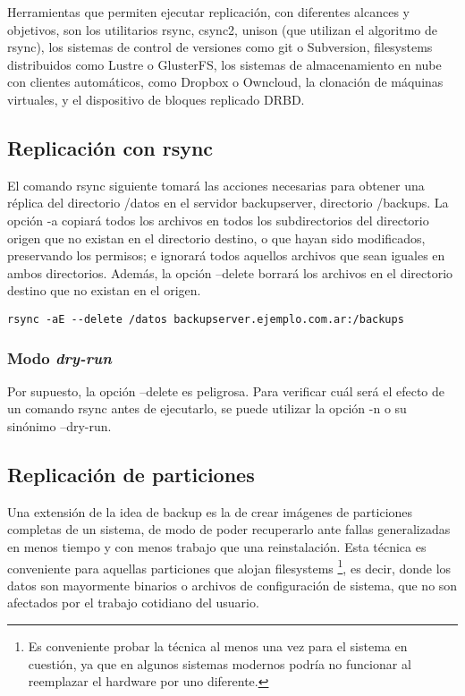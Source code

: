 Herramientas que permiten ejecutar replicación, con diferentes alcances y objetivos, son los utilitarios 
rsync, csync2, unison (que utilizan el algoritmo de rsync), los sistemas de control de versiones 
como git o Subversion, filesystems distribuidos como Lustre o GlusterFS, los sistemas de 
almacenamiento en nube con clientes automáticos, como Dropbox o Owncloud, la clonación de 
máquinas virtuales, y el dispositivo de bloques replicado DRBD. 

\subsection{Replicación con rsync}

El comando rsync siguiente tomará las acciones necesarias para obtener una réplica del directorio /datos en el servidor backupserver, directorio /backups. La opción -a copiará todos los archivos en todos los subdirectorios del directorio origen que no existan en el directorio destino, o que hayan sido modificados, preservando los permisos; e ignorará todos aquellos archivos que sean iguales en ambos directorios. Además, la opción --delete borrará los archivos en el directorio destino que no existan en el origen. 

\begin{lstlisting}
rsync -aE --delete /datos backupserver.ejemplo.com.ar:/backups
\end{lstlisting}

\subsubsection{Modo \emph{dry-run}}

Por supuesto, la opción –delete es peligrosa. Para verificar cuál será el efecto de un comando rsync antes de ejecutarlo, se puede utilizar la opción -n o su sinónimo –dry-run.

\subsection{Replicación de particiones}

Una extensión de la idea de backup es la de crear imágenes de particiones completas de un sistema, de modo de poder recuperarlo ante fallas generalizadas en menos tiempo y con menos trabajo que una reinstalación. Esta técnica es conveniente para aquellas particiones que alojan filesystems \footnote{
Es conveniente probar la técnica al menos una vez para el sistema en cuestión, 
ya que en algunos sistemas modernos podría no funcionar al reemplazar el 
hardware por uno diferente.}, es decir, donde los datos son mayormente binarios o archivos de configuración de sistema, que no son afectados por el trabajo cotidiano del usuario.

